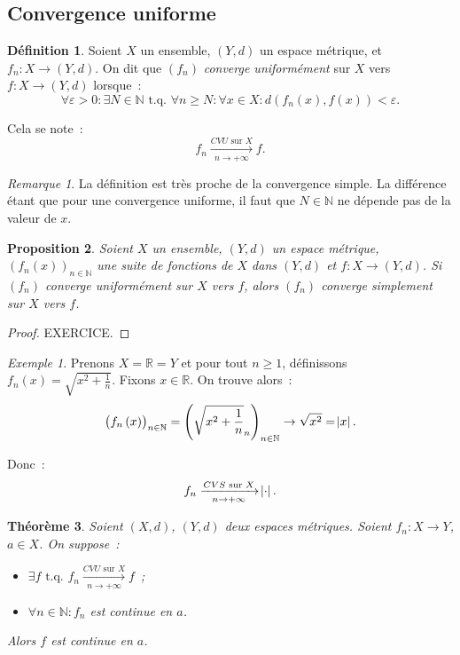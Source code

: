 \documentclass{report}
\newtheorem{thm}{Théorème}[chapter]
\newtheorem{prp}[thm]{Proposition}
\theoremstyle{definition}
\newtheorem{déf}[thm]{Définition}
\theoremstyle{remark}
\newtheorem*{rmq}{Remarque}
\newtheorem{ex}{Exemple}[chapter]
\newcommand{\R}{\mathbb R}
\newcommand{\N}{\mathbb N}
\newcommand{\tq}{\text{ t.q. }}
\newcommand{\seq}[3]{\left(#1_{#2}\right)_{#2 \in #3}}
\newcommand{\seqf}[4]{\left(#1_{#2}\left(#3\right)\right)_{#2 \in #4}}
\newcommand{\CONV}[5]{\xrightarrow[#2 \to #3]{#4 \text{ #5 } #1}}
\newcommand{\CVS}[3]{\CONV{#1}{#2}{#3}{CVS}{sur}}
\newcommand{\CVU}[3]{\CONV{#1}{#2}{#3}{CVU}{sur}}
\newcommand{\pinfty}{{+\infty}}
\begin{document}
		\subsection{Convergence uniforme}
			\begin{déf} Soient $X$ un ensemble, $(Y, d)$ un espace métrique, et $f_n : X \to (Y, d)$. On dit que $(f_n)$ \textit{converge uniformément} sur $X$
			vers $f : X \to (Y, d)$ lorsque~:
			\[\forall \varepsilon > 0 : \exists N \in \N \tq \forall n \geq N : \forall x \in X : d(f_n(x), f(x)) < \varepsilon.\]

			Cela se note~:
			\[f_n \CVU Xn\pinfty f.\]
			\end{déf}

			\begin{rmq} La définition est très proche de la convergence simple. La différence étant que pour une convergence uniforme, il faut que
			$N \in \N$ ne dépende pas de la valeur de $x$. \end{rmq}

			\begin{prp} Soient $X$ un ensemble, $(Y, d)$ un espace métrique, $\seqf fnx\N$ une suite de fonctions de $X$ dans $(Y, d)$ et $f : X \to (Y, d)$.
			Si $(f_n)$ converge uniformément sur $X$ vers $f$, alors $(f_n)$ converge simplement sur $X$ vers $f$. \end{prp}

			\begin{proof} EXERCICE.
			\end{proof}

			\begin{ex} Prenons $X = \R = Y$ et pour tout $n \geq 1$, définissons $f_n(x) = \sqrt{x^2 + \frac 1n}$. Fixons $x \in \R$. On trouve alors~:
			\[\seqf fnx\N = \seq {\sqrt{x^2 + \frac 1n}}n\N \to \sqrt {x^2} = \abs x.\]

			Donc~:
			\[f_n \CVS Xn\pinfty \abs \cdot.\]
			\end{ex}

			\begin{thm} Soient $(X, d)$, $(Y, d)$ deux espaces métriques. Soient $f_n : X \to Y$, $a \in X$. On suppose~:
			\begin{itemize}
				\item $\exists f \tq f_n \CVU Xn\pinfty f$~;
				\item $\forall n \in \N : f_n$ est continue en $a$.
			\end{itemize}

			Alors $f$ est continue en $a$.
			\end{thm}
\end{document}
